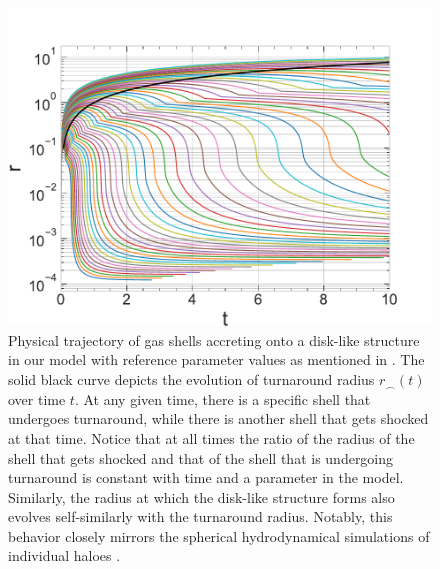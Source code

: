 \begin{figure}[htbp]
\centering
\includegraphics[width=0.6\linewidth]{plots/Eds-gas-1.67_trajectory_phys_ref.pdf}
\caption[]{Physical trajectory of gas shells accreting onto a disk-like structure in our model with reference parameter values as mentioned in . The solid black curve depicts the evolution of turnaround radius $r_{\smallfrown}(t)$ over time $t$. At any given time, there is a specific shell that undergoes turnaround, while there is another shell that gets shocked at that time. Notice that at all times the ratio of the radius of the shell that gets shocked and that of the shell that is undergoing turnaround is constant with time and a parameter in the model. Similarly, the radius at which the disk-like structure forms also evolves self-similarly with the turnaround radius. Notably, this behavior closely mirrors the spherical hydrodynamical simulations of individual haloes \cite{2006Dekel&Birnboim}.}
\label{fig:gas-traj-phys-ch:ssr}
\end{figure}


